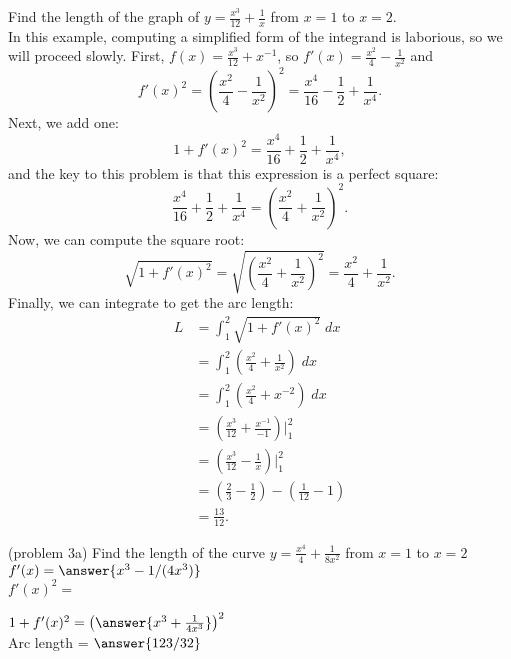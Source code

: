 \documentclass{ximera}
\begin{document}
\begin{example}[example 3] Find the length of the graph of 
$y = \frac{x^3}{12} + \frac{1}{x}$ from $x = 1$ to $x = 2$.\\
In this example, computing a simplified form of the integrand is laborious, so we will proceed slowly.
First, $f(x) = \frac{x^3}{12} + x^{-1}$, so $f'(x) = \frac{x^2}{4} - \frac{1}{x^2}$ and
\[
f'(x)^2 = \left( \frac{x^2}{4} - \frac{1}{x^2} \right)^2 = \frac{x^4}{16} - \frac12 + \frac{1}{x^4}.
\]
Next, we add one:
\[
1 + f'(x)^2 = \frac{x^4}{16} + \frac12 + \frac{1}{x^4},
\]
and the key to this problem is that this expression is a perfect square:
\[
\frac{x^4}{16} + \frac12 + \frac{1}{x^4} = \left( \frac{x^2}{4} + \frac{1}{x^2}\right)^2.
\]
Now, we can compute the square root:
\[
\sqrt{1+f'(x)^2} = \sqrt{\left( \frac{x^2}{4} + \frac{1}{x^2}\right)^2 } = \frac{x^2}{4} + \frac{1}{x^2}.
\]
Finally, we can integrate to get the arc length:
\begin{align*}
L &= \int_1^2 \sqrt{1+f'(x)^2} \; dx \\
  &= \int_1^2 \left(\frac{x^2}{4} + \frac{1}{x^2} \right) \; dx  \\
  &= \int_1^2 \left(\frac{x^2}{4} + x^{-2} \right) \; dx \\
  &= \left(\frac{x^3}{12} + \frac{x^{-1}}{-1} \right) \bigg|_1^2 \\
  &= \left(\frac{x^3}{12} - \frac{1}{x} \right) \bigg|_1^2 \\
  &= \left(\frac23 - \frac12\right) - \left(\frac{1}{12} - 1\right) \\
  &= \frac{13}{12}.  
\end{align*}
\end{example}




\begin{problem}(problem 3a)
Find the length of the curve $\displaystyle{y = \frac{x^4}{4} + \frac{1}{8x^2}}$ from $x = 1$ to $x = 2$\\

$f'(x) = \answer{x^3 - 1/(4x^3)}$\\

$f'(x)^2 =$

\begin{multipleChoice}
\end{multipleChoice}

$1+f'(x)^2 = \left(\answer{x^3 + \frac{1}{4x^3}}\right)^2$\\

Arc length = $\answer{123/32}$
\end{problem}
\end{document}
